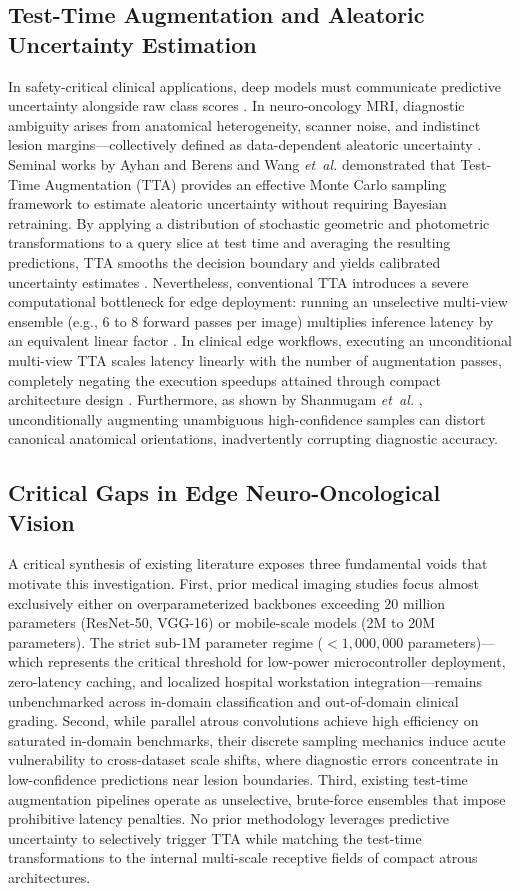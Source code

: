 \subsection{Test-Time Augmentation and Aleatoric Uncertainty Estimation}
In safety-critical clinical applications, deep models must communicate predictive uncertainty alongside raw class scores \cite{7, 41}. In neuro-oncology MRI, diagnostic ambiguity arises from anatomical heterogeneity, scanner noise, and indistinct lesion margins---collectively defined as data-dependent aleatoric uncertainty \cite{4, 35}. Seminal works by Ayhan and Berens \cite{4} and Wang \emph{et~al.} \cite{35} demonstrated that Test-Time Augmentation (TTA) provides an effective Monte Carlo sampling framework to estimate aleatoric uncertainty without requiring Bayesian retraining. By applying a distribution of stochastic geometric and photometric transformations to a query slice at test time and averaging the resulting predictions, TTA smooths the decision boundary and yields calibrated uncertainty estimates \cite{4, 35, 42}. Nevertheless, conventional TTA introduces a severe computational bottleneck for edge deployment: running an unselective multi-view ensemble (e.g., 6 to 8 forward passes per image) multiplies inference latency by an equivalent linear factor \cite{42}. In clinical edge workflows, executing an unconditional multi-view TTA scales latency linearly with the number of augmentation passes, completely negating the execution speedups attained through compact architecture design \cite{35, 42}. Furthermore, as shown by Shanmugam \emph{et~al.} \cite{42}, unconditionally augmenting unambiguous high-confidence samples can distort canonical anatomical orientations, inadvertently corrupting diagnostic accuracy.

\subsection{Critical Gaps in Edge Neuro-Oncological Vision}
A critical synthesis of existing literature exposes three fundamental voids that motivate this investigation. First, prior medical imaging studies focus almost exclusively either on overparameterized backbones exceeding 20 million parameters (ResNet-50, VGG-16) or mobile-scale models (2M to 20M parameters). The strict sub-1M parameter regime ($<1,000,000$ parameters)---which represents the critical threshold for low-power microcontroller deployment, zero-latency caching, and localized hospital workstation integration---remains unbenchmarked across in-domain classification and out-of-domain clinical grading. Second, while parallel atrous convolutions achieve high efficiency on saturated in-domain benchmarks, their discrete sampling mechanics induce acute vulnerability to cross-dataset scale shifts, where diagnostic errors concentrate in low-confidence predictions near lesion boundaries. Third, existing test-time augmentation pipelines operate as unselective, brute-force ensembles that impose prohibitive latency penalties. No prior methodology leverages predictive uncertainty to selectively trigger TTA while matching the test-time transformations to the internal multi-scale receptive fields of compact atrous architectures.

